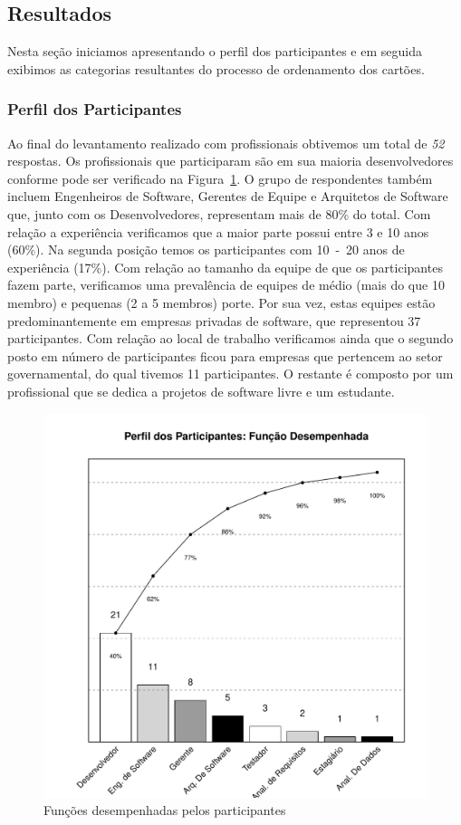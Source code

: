 \subsection{Resultados}
\label{sec:resultados}

Nesta seção iniciamos apresentando o perfil dos participantes e em seguida
exibimos as categorias resultantes do processo de ordenamento dos cartões.

\subsubsection{Perfil dos Participantes}
\label{ssub:perfil_participantes}

Ao final do levantamento realizado com profissionais obtivemos um total de
\textit{52} respostas. Os profissionais que participaram são em sua maioria
desenvolvedores conforme pode ser verificado na
Figura~\ref{fig:grafico_escolha_ferramentas_funcao_participantes}. O grupo de
respondentes também incluem Engenheiros de Software, Gerentes de Equipe e
Arquitetos de Software que, junto com os Desenvolvedores, representam mais de
80\% do total. Com relação a experiência verificamos que a maior parte possui
entre 3 e 10 anos (60\%). Na segunda posição temos os participantes com 10~-~20
anos de experiência (17\%). Com relação ao tamanho da equipe de que os
participantes fazem parte, verificamos uma prevalência de equipes de médio (mais
do que 10 membro) e pequenas (2 a 5 membros) porte. Por sua vez, estas equipes
estão predominantemente em empresas privadas de software, que representou 37
participantes. Com relação ao local de trabalho verificamos ainda que o segundo
posto em número de par\-ti\-ci\-pan\-tes ficou para empresas que pertencem ao
setor governamental, do qual tivemos 11 participantes. O restante é composto por
um profissional que se dedica a projetos de software livre e um estudante.

\begin{figure}[htpb]
	\centering
	\includegraphics[width=0.5\linewidth]{./chapter-estudo-funcionalidades-fgrm/img/grafico_escolha_ferramentas_funcao_participantes.pdf}
	\caption{Funções desempenhadas pelos participantes}
\label{fig:grafico_escolha_ferramentas_funcao_participantes}
\end{figure}

